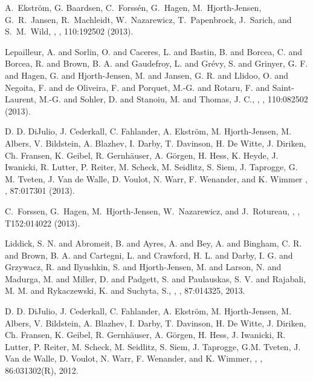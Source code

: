 \begin{thebibliography}{200}
  A.~Ekstr\"om, G. Baardsen, C.~Forss\'en, G.~Hagen, M.~Hjorth-Jensen, G.~R.~Jansen, R.~Machleidt, W.~Nazarewicz, T.~Papenbrock, J.~Sarich, and S.~M.~Wild, 
, 
,  110:192502 (2013).


Lepailleur, A. and Sorlin, O. and Caceres, L. and Bastin, B. and Borcea, C. and Borcea, R. and Brown, B. A. and Gaudefroy, L. and Gr\'evy, S. and Grinyer, G. F. and Hagen, G. and Hjorth-Jensen, M. and Jansen, G. R. and Llidoo, O. and Negoita, F. and de Oliveira, F. and Porquet, M.-G. and Rotaru, F. and Saint-Laurent, M.-G. and Sohler, D. and Stanoiu, M. and Thomas, J. C.,
, 
,  110:082502 (2013).

D. D. DiJulio, J. Cederkall, C. Fahlander, A. Ekstr\"om, M. Hjorth-Jensen, M. Albers, V. Bildstein, A. Blazhev, I. Darby, T. Davinson, H. De Witte, J. Diriken, Ch. Fransen, K. Geibel, R. Gernhäuser, A. Görgen, H. Hess, K. Heyde, J. Iwanicki, R. Lutter, P. Reiter, M. Scheck, M. Seidlitz, S. Siem, J. Taprogge, G. M. Tveten, J. Van de Walle, D. Voulot, N. Warr, F. Wenander, and K. Wimmer
, 
,  87:017301 (2013).



 C.~Forssen, G.~Hagen, M.~Hjorth-Jensen, W.~Nazarewicz, and J.~Rotureau,
, 
,  T152:014022 (2013).

 Liddick, S. N. and Abromeit, B. and Ayres, A. and Bey, A. and Bingham, C. R. and Brown, B. A. and Cartegni, L. and Crawford, H. L. and Darby, I. G. and Grzywacz, R. and Ilyushkin, S. and Hjorth-Jensen, M. and Larson, N. and Madurga, M. and Miller, D. and Padgett, S. and Paulauskas, S. V. and Rajabali, M. M. and Rykaczewski, K. and Suchyta, S.,
, 
,  87:014325, 2013.




  D. D. DiJulio, J. Cederkall, C. Fahlander, A. Ekstr\"om, M. Hjorth-Jensen, M. Albers, V. Bildstein,
A. Blazhev, I. Darby, T. Davinson, H. De Witte, J. Diriken, Ch. Fransen, K. Geibel, R. Gernh\"auser,
A. G\"orgen, H. Hess, J. Iwanicki, R. Lutter, P. Reiter, M. Scheck, M. Seidlitz, S. Siem, J. Taprogge,
G.M. Tveten, J. Van de Walle, D. Voulot, N. Warr, F. Wenander, and K. Wimmer,
, 
,  86:031302(R), 2012.


\end{thebibliography}
